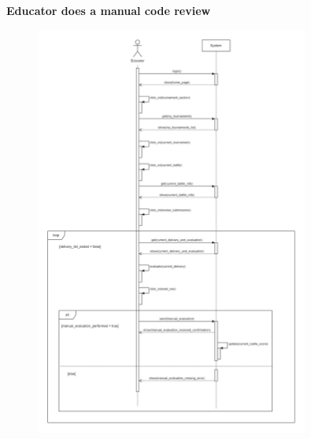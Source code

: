 \documentclass[../RASD.tex]{subfiles}
\begin{document}
    \textbf{Educator does a manual code review}
    \begin{figure}[h!]
        \centering
        \includegraphics[width=0.8\textwidth]{../assets/section_3/EducatorDoesAManualCodeReview.png}
    \end{figure}
    \newpage
\end{document}
